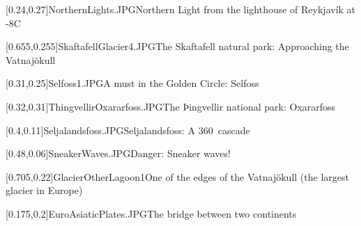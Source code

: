 



\graphicspath{{Figures/}{Figures/Iceland/}}


\subtitle{Day 1}
\date{07.10.2019}


    
    [0.24,0.27]{NorthernLights.JPG}{Northern Light from the lighthouse of Reykjav\'ik at -8\textdegree{}C}
    
    [0.655,0.255]{SkaftafellGlacier4.JPG}{The Skaftafell natural park: Approaching the Vatnaj\"okull}
    
    [0.31,0.25]{Selfoss1.JPG}{A must in the Golden Circle: Selfoss}
    
    [0.32,0.31]{ThingvellirOxararfoss.JPG}{The Þingvellir national park: Oxararfoss}
    
    [0.4,0.11]{Seljalandsfoss.JPG}{Seljalandsfoss: A 360\textdegree\ cascade}
    
    
    [0.48,0.06]{SneakerWaves.JPG}{Danger: Sneaker waves!}
    
    [0.705,0.22]{GlacierOtherLagoon1}{One of the edges of the Vatnaj\"okull (the largest glacier in Europe)}
    
    [0.175,0.2]{EuroAsiaticPlates.JPG}{The bridge between two continents}
    

